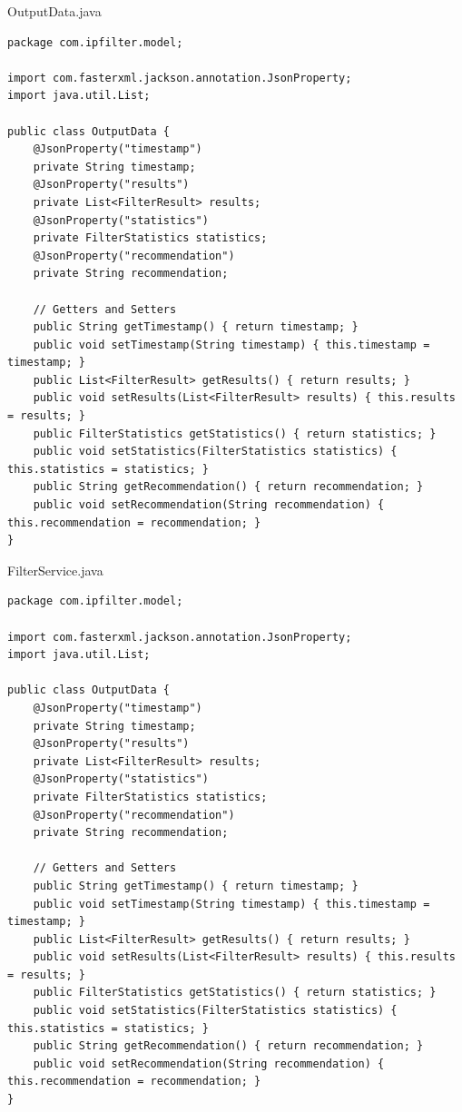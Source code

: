 OutputData.java
\begin{verbatim}
package com.ipfilter.model;

import com.fasterxml.jackson.annotation.JsonProperty;
import java.util.List;

public class OutputData {
    @JsonProperty("timestamp")
    private String timestamp;
    @JsonProperty("results")
    private List<FilterResult> results;
    @JsonProperty("statistics")
    private FilterStatistics statistics;
    @JsonProperty("recommendation")
    private String recommendation;

    // Getters and Setters
    public String getTimestamp() { return timestamp; }
    public void setTimestamp(String timestamp) { this.timestamp = timestamp; }
    public List<FilterResult> getResults() { return results; }
    public void setResults(List<FilterResult> results) { this.results = results; }
    public FilterStatistics getStatistics() { return statistics; }
    public void setStatistics(FilterStatistics statistics) { this.statistics = statistics; }
    public String getRecommendation() { return recommendation; }
    public void setRecommendation(String recommendation) { this.recommendation = recommendation; }
}
\end{verbatim}

FilterService.java
\begin{verbatim}
package com.ipfilter.model;

import com.fasterxml.jackson.annotation.JsonProperty;
import java.util.List;

public class OutputData {
    @JsonProperty("timestamp")
    private String timestamp;
    @JsonProperty("results")
    private List<FilterResult> results;
    @JsonProperty("statistics")
    private FilterStatistics statistics;
    @JsonProperty("recommendation")
    private String recommendation;

    // Getters and Setters
    public String getTimestamp() { return timestamp; }
    public void setTimestamp(String timestamp) { this.timestamp = timestamp; }
    public List<FilterResult> getResults() { return results; }
    public void setResults(List<FilterResult> results) { this.results = results; }
    public FilterStatistics getStatistics() { return statistics; }
    public void setStatistics(FilterStatistics statistics) { this.statistics = statistics; }
    public String getRecommendation() { return recommendation; }
    public void setRecommendation(String recommendation) { this.recommendation = recommendation; }
}
\end{verbatim}

